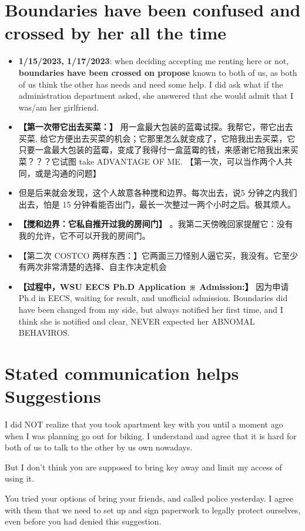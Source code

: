 \documentclass[9pt, b5paper]{article}
\begin{document}
\section{Boundaries have been confused and crossed by her all the time}
\label{sec-7}
\begin{itemize}
\item \textbf{1/15/2023, 1/17/2023}: when deciding accepting me renting here or not, \textbf{boundaries have been crossed on propose} known to both of us, as both of us think the other has needs and need some help. I did ask what if the administration department asked, she answered that she would admit that I was/am her girlfriend.
\item \textbf{【第一次带它出去买菜：】} 用一盒最大包装的蓝霉试探。我帮它，带它出去买菜, 给它方便出去买菜的机会；它那里怎么就变成了，它陪我出去买菜，它只要一盒最大包装的蓝霉，变成了我得付一盒蓝霉的钱，来感谢它陪我出来买菜？？？它试图 take ADVANTAGE OF ME. 【第一次，可以当作两个人共同，或是沟通的问题】
\item 但是后来就会发现，这个人故意各种搅和边界。每次出去，说5 分钟之内我们出去，怕是 15 分钟看能否出门，最长一次整过一两个小时之后。极其烦人。
\item \textbf{【搅和边界：它私自推开过我的房间门】} 。我第二天傍晚回家提醒它：没有我的允许，它不可以开我的房间门。
\item 【第二次 COSTCO 两样东西：】它两面三刀怪别人逼它买，我没有。它至少有两次非常清楚的选择、自主作决定机会
\item \textbf{【过程中，WSU EECS Ph.D Application ※ Admission:】} 因为申请Ph.d in EECS, waiting for result, and unofficial admission. Boundaries did have been changed from my side, but always notified her first time, and I think she is notified and clear, NEVER expected her ABNOMAL BEHAVIROS.
\end{itemize}

\section{Stated communication helps Suggestions}
\label{sec-8}
I did NOT realize that you took apartment key with you until a moment ago when I was planning go out for biking. I understand and agree that it is hard for both of us to talk to the other by us own nowadays. 

But I don't think you are supposed to bring key away and limit my access of using it. 

You tried your options of bring your friends, and called police yesterday. I agree with them that we need to set up and sign paperwork to legally protect ourselves, even before you had denied this suggestion. 
\end{document}

